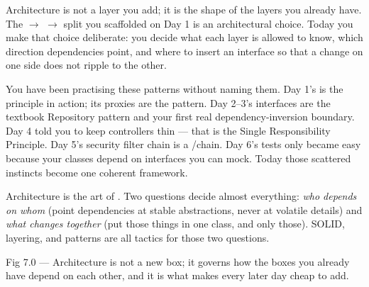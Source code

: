  Architecture is not a layer you add; it is the shape of the layers you already have. The  $\rightarrow$  $\rightarrow$  split you scaffolded on Day 1 is an architectural choice. Today you make that choice deliberate: you decide what each layer is allowed to know, which direction dependencies point, and where to insert an interface so that a change on one side does not ripple to the other.

 You have been practising these patterns without naming them. Day 1's  is the  principle in action; its proxies are the  pattern. Day 2--3's  interfaces are the textbook Repository pattern and your first real dependency-inversion boundary. Day 4 told you to keep controllers thin --- that is the Single Responsibility Principle. Day 5's security filter chain is a /chain. Day 6's tests only became easy because your classes depend on interfaces you can mock. Today those scattered instincts become one coherent framework.

\begin{keyidea}
Architecture is the art of . Two questions decide almost everything: \emph{who depends on whom} (point dependencies at stable abstractions, never at volatile details) and \emph{what changes together} (put those things in one class, and only those). SOLID, layering, and patterns are all tactics for those two questions.
\end{keyidea}

\begin{wbfigure}{Fig 7.0 — Architecture is not a new box; it governs how the boxes you already have depend on each other, and it is what makes every later day cheap to add.}
\end{wbfigure}

